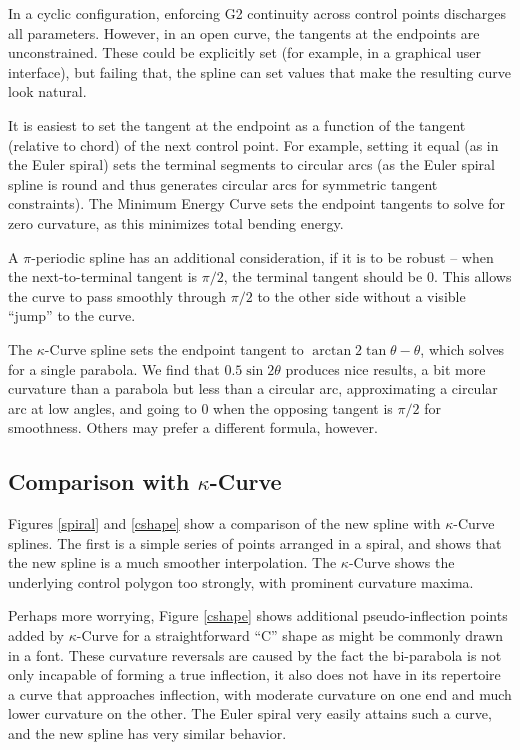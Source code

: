 \documentclass{article}
\newcommand{\kcurve}{$\kappa$-Curve}
\begin{document}
In a cyclic configuration, enforcing G2 continuity across control points discharges all parameters. However, in an open curve, the tangents at the endpoints are unconstrained. These could be explicitly set (for example, in a graphical user interface), but failing that, the spline can set values that make the resulting curve look natural.

It is easiest to set the tangent at the endpoint as a function of the tangent (relative to chord) of the next control point. For example, setting it equal (as in the Euler spiral) sets the terminal segments to circular arcs (as the Euler spiral spline is round and thus generates circular arcs for symmetric tangent constraints). The Minimum Energy Curve sets the endpoint tangents to solve for zero curvature, as this minimizes total bending energy.

A $\pi$-periodic spline has an additional consideration, if it is to be robust -- when the next-to-terminal tangent is $\pi/2$, the terminal tangent should be $0$. This allows the curve to pass smoothly through $\pi/2$ to the other side without a visible ``jump'' to the curve.

The \kcurve{} spline sets the endpoint tangent to $\arctan{2\tan \theta} - \theta$, which solves for a single parabola. We find that $0.5\sin 2\theta$ produces nice results, a bit more curvature than a parabola but less than a circular arc, approximating a circular arc at low angles, and going to $0$ when the opposing tangent is $\pi/2$ for smoothness. Others may prefer a different formula, however.

\subsection{Comparison with \kcurve{}}

Figures \ref{spiral} and \ref{cshape} show a comparison of the new spline with \kcurve{} splines. The first is a simple series of points arranged in a spiral, and shows that the new spline is a much smoother interpolation. The \kcurve{} shows the underlying control polygon too strongly, with prominent curvature maxima.

Perhaps more worrying, Figure \ref{cshape} shows additional pseudo-inflection points added by \kcurve{} for a straightforward ``C'' shape as might be commonly drawn in a font. These curvature reversals are caused by the fact the bi-parabola is not only incapable of forming a true inflection, it also does not have in its repertoire a curve that approaches inflection, with moderate curvature on one end and much lower curvature on the other. The Euler spiral very easily attains such a curve, and the new spline has very similar behavior.
\end{document}
